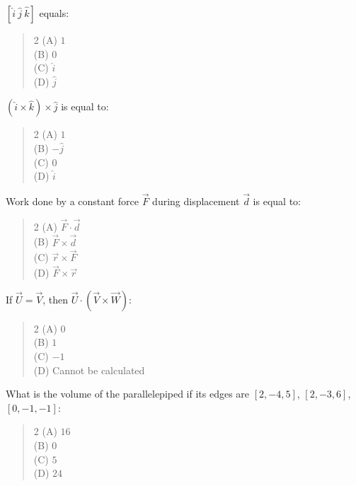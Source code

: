 \documentclass[11pt,a4paper]{article}
\begin{document}
\begin{mcqlist}
\item $[\hat{i}\ \hat{j}\ \hat{k}]$ equals:
\begin{quote}\begin{multicols}{2}
\noindent (A) $1$ \\
(B) $0$ \\
(C) $\hat{i}$ \\
(D) $\hat{j}$
\end{multicols}\end{quote}

\item $(\hat{i}\times\hat{k})\times\hat{j}$ is equal to:
\begin{quote}\begin{multicols}{2}
\noindent (A) $1$ \\
(B) $-\hat{j}$ \\
(C) $0$ \\
(D) $\hat{i}$
\end{multicols}\end{quote}

\item Work done by a constant force $\vec{F}$ during displacement $\vec{d}$ is equal to:
\begin{quote}\begin{multicols}{2}
\noindent (A) $\vec{F}\cdot\vec{d}$ \\
(B) $\vec{F}\times\vec{d}$ \\
(C) $\vec{r}\times\vec{F}$ \\
(D) $\vec{F}\times\vec{r}$
\end{multicols}\end{quote}

\item If $\vec{U}=\vec{V}$, then $\vec{U}\cdot(\vec{V}\times\vec{W})$:
\begin{quote}\begin{multicols}{2}
\noindent (A) $0$ \\
(B) $1$ \\
(C) $-1$ \\
(D) Cannot be calculated
\end{multicols}\end{quote}

\item What is the volume of the parallelepiped if its edges are $[2,-4,5]$, $[2,-3,6]$, $[0,-1,-1]$:
\begin{quote}\begin{multicols}{2}
\noindent (A) $16$ \\
(B) $0$ \\
(C) $5$ \\
(D) $24$
\end{multicols}\end{quote}


\end{mcqlist}
\end{document}
